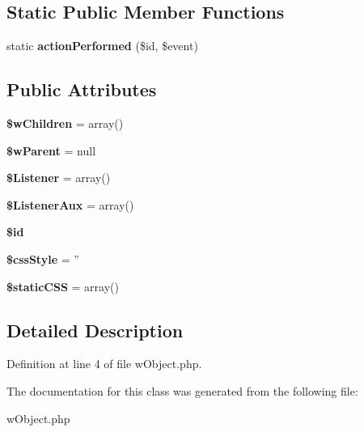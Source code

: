 \subsection*{Static Public Member Functions}
\begin{DoxyCompactItemize}
\item 
\hypertarget{classwObject_accbeaa3b6f4b463074d22e38277ff5be}{
static {\bfseries actionPerformed} (\$id, \$event)}
\label{classwObject_accbeaa3b6f4b463074d22e38277ff5be}

\end{DoxyCompactItemize}
\subsection*{Public Attributes}
\begin{DoxyCompactItemize}
\item 
\hypertarget{classwObject_a8be6afc58b52e1487a52b32da887205d}{
{\bfseries \$wChildren} = array()}
\label{classwObject_a8be6afc58b52e1487a52b32da887205d}

\item 
\hypertarget{classwObject_a564cf9353174fd8a29c6c43c98856669}{
{\bfseries \$wParent} = null}
\label{classwObject_a564cf9353174fd8a29c6c43c98856669}

\item 
\hypertarget{classwObject_af0838da9480973fe3ed12a541c4470ba}{
{\bfseries \$Listener} = array()}
\label{classwObject_af0838da9480973fe3ed12a541c4470ba}

\item 
\hypertarget{classwObject_ac77a081b86a9e364c8525ffa3da47b17}{
{\bfseries \$ListenerAux} = array()}
\label{classwObject_ac77a081b86a9e364c8525ffa3da47b17}

\item 
\hypertarget{classwObject_aa61efda77d012662d267f65e7ec0e434}{
{\bfseries \$id}}
\label{classwObject_aa61efda77d012662d267f65e7ec0e434}

\item 
\hypertarget{classwObject_abaf4a7af4e5ba939c294eb30c859da83}{
{\bfseries \$cssStyle} = ''}
\label{classwObject_abaf4a7af4e5ba939c294eb30c859da83}

\item 
\hypertarget{classwObject_afe7fc5f276159a917c3964ff1c9ae26c}{
{\bfseries \$staticCSS} = array()}
\label{classwObject_afe7fc5f276159a917c3964ff1c9ae26c}

\end{DoxyCompactItemize}


\subsection{Detailed Description}


Definition at line 4 of file wObject.php.



The documentation for this class was generated from the following file:\begin{DoxyCompactItemize}
\item 
wObject.php\end{DoxyCompactItemize}

